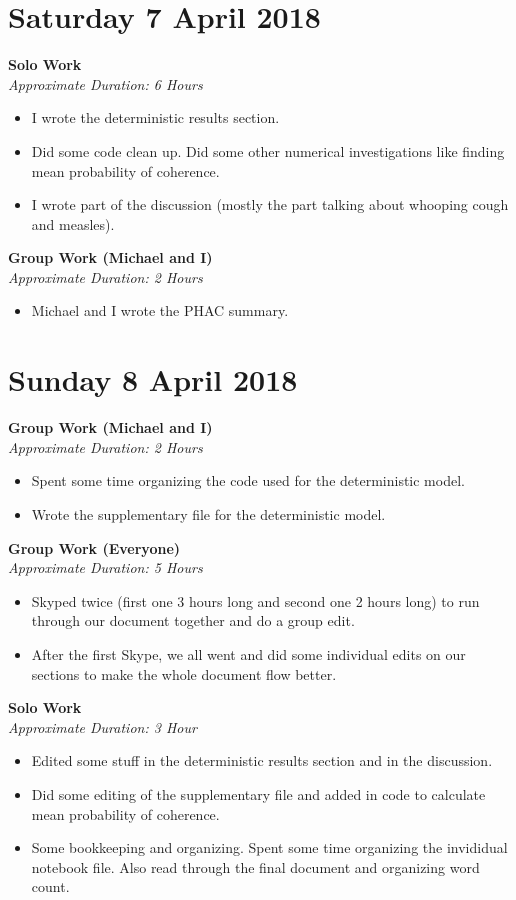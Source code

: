 \documentclass[12pt]{article}\usepackage[]{graphicx}\usepackage[]{color}
\begin{document}
\begin{itemize}
\section*{Saturday 7 April 2018}

\textbf{Solo Work}\\
\emph{Approximate Duration: 6 Hours}
\begin{itemize}
\item I wrote the deterministic results section.
\item Did some code clean up. Did some other numerical investigations like finding mean probability of coherence.
\item I wrote part of the discussion (mostly the part talking about whooping cough and measles).
\end{itemize}

\textbf{Group Work (Michael and I)}\\
\emph{Approximate Duration: 2 Hours}
\begin{itemize}
\item Michael and I wrote the PHAC summary.
\end{itemize}

\section*{Sunday 8 April 2018}

\textbf{Group Work (Michael and I)}\\
\emph{Approximate Duration: 2 Hours}
\begin{itemize}
\item Spent some time organizing the code used for the deterministic model.
\item Wrote the supplementary file for the deterministic model.
\end{itemize}

\textbf{Group Work (Everyone)}\\
\emph{Approximate Duration: 5 Hours}
\begin{itemize}
\item Skyped twice (first one 3 hours long and second one 2 hours long) to run through our document together and do a group edit.
\item After the first Skype, we all went and did some individual edits on our sections to make the whole document flow better.
\end{itemize}

\textbf{Solo Work}\\
\emph{Approximate Duration: 3 Hour}
\begin{itemize}
\item Edited some stuff in the deterministic results section and in the discussion.
\item Did some editing of the supplementary file and added in code to calculate mean probability of coherence.
\item Some bookkeeping and organizing. Spent some time organizing the invididual notebook file. Also read through the final document and organizing word count.
\end{itemize}



\end{itemize}
\end{document}
